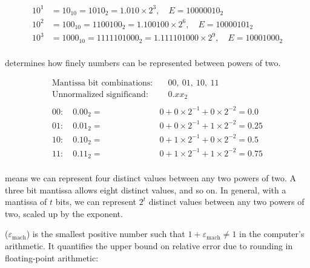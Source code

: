 
\begin{align*}
    10^1 &= 10_{10} = 1010_2 = 1.010 \times 2^{3}, \quad \textit{E} = 10000010_2 \\
    10^2 &= 100_{10} = 1100100_2 = 1.100100 \times 2^{6}, \quad \textit{E} = 10000101_2 \\
    10^3 &= 1000_{10} = 1111101000_2 = 1.111101000 \times 2^{9}, \quad \textit{E} = 10001000_2 \\
\end{align*}




 determines how finely numbers can be represented between powers of two. 

\begin{align*}
    \text{Mantissa bit combinations:} &\quad 00,\ 01,\ 10,\ 11 \\
    \text{Unnormalized significand:} &\quad 0.xx_2 \\
    \\
    00: \quad 0.00_2 =& 0 + 0 \times 2^{-1} + 0 \times 2^{-2} = 0.0 \\
    01: \quad 0.01_2 =& 0 + 0 \times 2^{-1} + 1 \times 2^{-2} = 0.25 \\
    10: \quad 0.10_2 =& 0 + 1 \times 2^{-1} + 0 \times 2^{-2} = 0.5 \\
    11: \quad 0.11_2 =& 0 + 1 \times 2^{-1} + 1 \times 2^{-2} = 0.75 \\
\end{align*}

 means we can represent four distinct values between any two powers of two. A three bit mantissa allows eight distinct values, and so on.
In general, with a mantissa of $t$ bits, we can represent $2^t$ distinct values between any two powers of two, scaled up by the exponent.

 ($\varepsilon_{\text{mach}}$) is the smallest positive number such that $1 + \varepsilon_{\text{mach}} \neq 1$ in the computer's arithmetic. It quantifies the upper bound on relative error due to rounding in floating-point arithmetic:

